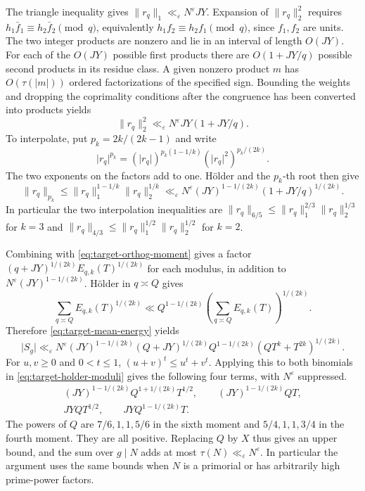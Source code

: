 \documentclass[11pt]{amsart}
\numberwithin{equation}{section}
\theoremstyle{remark}
\begin{document}
The triangle inequality gives
\(\|r_q\|_1\ll_\varepsilon N^\varepsilon JY\).
Expansion of \(\|r_q\|_2^2\) requires
\(h_1\bar f_1\equiv h_2\bar f_2\pmod q\), equivalently
\(h_1 f_2\equiv h_2 f_1\pmod q\), since \(f_1,f_2\) are units.
The two integer products are nonzero and lie in an interval of length
\(O(JY)\). For each of the \(O(JY)\) possible first products there are
\(O(1+JY/q)\) possible second products in its residue class. A given
nonzero product \(m\) has \(O(\tau(|m|))\) ordered factorizations of
the specified sign. Bounding the weights and dropping the coprimality
conditions after the congruence has been converted into products yields
\[
 \|r_q\|_2^2\ll_\varepsilon N^\varepsilon JY(1+JY/q).
\]
To interpolate, put \(p_k=2k/(2k-1)\) and write
\[
 \lvert r_q\rvert^{p_k}=
 (\lvert r_q\rvert)^{p_k(1-1/k)}
 (\lvert r_q\rvert^2)^{p_k/(2k)}.
\]
The two exponents on the factors add to one. H\"older and the
\(p_k\)-th root then give
\[
 \|r_q\|_{p_k}\le \|r_q\|_1^{1-1/k}\|r_q\|_2^{1/k}
 \ll_\varepsilon N^\varepsilon
          (JY)^{1-1/(2k)}(1+JY/q)^{1/(2k)} .
\]
In particular the two interpolation inequalities are
\(\|r_q\|_{6/5}\le\|r_q\|_1^{2/3}\|r_q\|_2^{1/3}\) for \(k=3\)
and \(\|r_q\|_{4/3}\le\|r_q\|_1^{1/2}\|r_q\|_2^{1/2}\) for \(k=2\).

Combining with \eqref{eq:target-orthog-moment} gives a factor
\((q+JY)^{1/(2k)}E_{q,k}(T)^{1/(2k)}\) for each modulus,
in addition to \(N^\varepsilon(JY)^{1-1/(2k)}\).
H\"older in \(q\asymp Q\) gives
\[
 \sum_{q\asymp Q} E_{q,k}(T)^{1/(2k)}
 \ll Q^{1-1/(2k)}
         \left(\sum_{q\asymp Q}E_{q,k}(T)\right)^{1/(2k)} .
\]
Therefore \eqref{eq:target-mean-energy} yields
\begin{equation}
 \lvert S_g\rvert \ll_\varepsilon N^\varepsilon
    (JY)^{1-1/(2k)}(Q+JY)^{1/(2k)}
    Q^{1-1/(2k)}(QT^k+T^{2k})^{1/(2k)} .
 \label{eq:target-holder-moduli}
\end{equation}
For \(u,v\ge0\) and \(0<t\le1\), \((u+v)^t\le u^t+v^t\).
Applying this to both binomials in \eqref{eq:target-holder-moduli}
gives the following four terms, with \(N^\varepsilon\) suppressed.
\begin{equation}
 \begin{gathered}
 (JY)^{1-1/(2k)} Q^{1+1/(2k)}T^{1/2},\qquad
 (JY)^{1-1/(2k)} QT,\\
 JYQT^{1/2},\qquad
 JYQ^{1-1/(2k)}T .
 \end{gathered}
 \label{eq:target-moment-four-terms}
\end{equation}
The powers of \(Q\) are \(7/6,1,1,5/6\) in the sixth moment and
\(5/4,1,1,3/4\) in the fourth moment. They are all positive. Replacing
\(Q\) by \(X\) thus gives an upper bound, and the sum over \(g\mid N\)
adds at most \(\tau(N)\ll_\varepsilon N^\varepsilon\). In particular
the argument uses the same bounds when \(N\) is a primorial or has
arbitrarily high prime-power factors.
\end{document}
